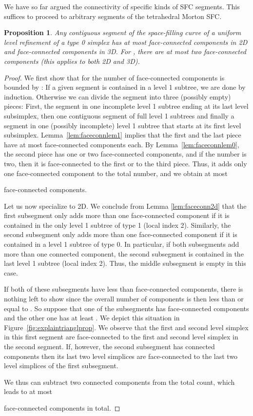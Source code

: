 \documentclass[a4paper,11pt]{article}
\newtheorem{prop}[thm]{Proposition}
\begin{document}
We have so far argued the connectivity of specific kinds of SFC segments.
This suffices to proceed to arbitrary segments of the tetrahedral Morton SFC.
\begin{prop}
\label{prop:faceconncomp}
 Any contiguous segment of the space-filling curve of a uniform level 
 refinement of a type 0 simplex has at most  face-connected components in 2D and
  face-connected components in 3D.
 For , there are at most two face-connected components
 (this applies to both 2D and 3D).
\end{prop}
\begin{proof}
 We first show that for  the number of face-connected
 com\-po\-nents is bounded by :
If a given segment is contained in a level 1 subtree, we are done by induction.
 Otherwise we can divide the segment into three (possibly empty) pieces:
 First,
the segment in one incomplete level 1 subtree ending at its last level 
 subsimplex,
 then one contiguous segment of full level 1 subtrees
 and finally a segment in one (possibly incomplete) level 1 subtree that
 starts at its first level  subsimplex.
 Lemma~\ref{lem:faceconnlem1}
 implies that the first and the last piece have at most  face-connected
 components each.
 By Lemma~\ref{lem:faceconnlem0}, the second piece has one or two
 face-connected components, and if the number is two, then it is face-connected
 to the first or to the third piece.
 Thus, it adds only one face-connected component to the total number, and we
 obtain at most
 
 face-connected components.

Let us now specialize to 2D.
We conclude from Lemma \ref{lem:faceconn2d} that
the first subsegment only adds more than one face-connected component if
it is contained in the only level 1 subtree of type 1 (local index 2).
Similarly, the second subsegment only adds more than one face-connected component
if it is contained in a level 1 subtree of type 0.
In particular, if both subsegments add more than one connected component, the
second subsegment is contained in the last level 1 subtree (local index 2).
Thus, the middle subsegment is empty in this case.

If both of these subsegments have less than  face-connected components, there
is nothing left to show since the overall number of components is then less
than or equal to .
So suppose that one of the subsegments has  face-connected components and the other one
has at least .
We depict this situation in Figure~\ref{fig:explaintrianglprop}.
We observe that the first and second level  simplex in this first segment
are face-connected to the first and second level  simplex in the second segment.
If, however, the second subsegment has  connected components then its last two 
level  simplices are face-connected to the last two level  simplices of the first 
subsegment.

We thus can subtract two connected components from the total count, which leads
to at most

face-connected components in total.
\end{proof}
\end{document}
